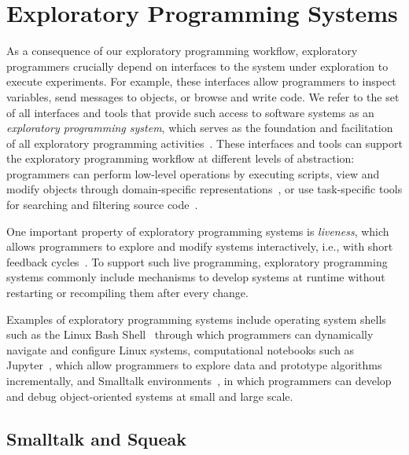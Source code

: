 
\section{Exploratory Programming Systems}
\label{sec:background/expsys}

As a consequence of our exploratory programming workflow, exploratory programmers crucially depend on interfaces to the system under exploration to execute experiments.
For example, these interfaces allow programmers to inspect variables, send messages to objects, or browse and write code.
We refer to the set of all interfaces and tools that provide such access to software systems as an \emph{exploratory programming system}, which serves as the foundation and facilitation of all exploratory programming activities~\cite{sandberg1988smalltalk,kery2017exploring,frolich2021generic,taeumel2022pattern}.
These interfaces and tools can support the exploratory programming workflow at different levels of abstraction:
programmers can perform low-level operations by executing scripts, view and modify objects through domain-specific representations~\cite{chis2015moldable}, or use task-specific tools for searching and filtering source code~\cite{taeumel2021toward}.

One important property of exploratory programming systems is \emph{liveness}, which allows programmers to explore and modify systems interactively, i.e., with short feedback cycles~\cite{sean2013usable,tanimoto2013perspective,rein2018exploratory}.
To support such live programming, exploratory programming systems commonly include mechanisms to develop systems at runtime without restarting or recompiling them after every change.

Examples of exploratory programming systems include operating system shells such as the Linux Bash Shell~\cite{raymond2003art} through which programmers can dynamically navigate and configure Linux systems, computational notebooks such as Jupyter~\cite{singer2020notes}, which allow programmers to explore data and prototype algorithms incrementally, and Smalltalk environments~\cite{goldberg1983smalltalk}, in which programmers can develop and debug object-oriented systems at small and large scale.

\subsection{Smalltalk and Squeak}
\label{sec:background/expsys/smalltalk}

